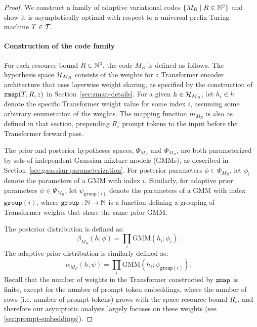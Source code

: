 \begin{proof}
We construct a family of adaptive variational codes $\{ M_R \mid R \in {\mathbb{N}^2} \}$ and show it is asymptotically optimal with respect to a universal prefix Turing machine $T \in {\mathcal{T}}$.

\paragraph{Construction of the code family}
For each resource bound $R \in {\mathbb{N}^2}$, the code $M_R$ is defined as follows.
The hypothesis space ${\mathcal{H}}_{M_R}$ consists of the weights for a Transformer encoder architecture that uses layerwise weight sharing, as specified by the construction of $\texttt{zmap}(T,R,z)$ in Section~\ref{sec:zmap-details}. For a given $h \in {\mathcal{H}}_{M_R}$, let $h_i \in h$ denote the specific Transformer weight value for some index $i$, assuming some arbitrary enumeration of the weights.
The mapping function $m_{M_R}$ is also as defined in that section, prepending $R_s$ prompt tokens to the input before the Transformer forward pass. 

The prior and posterior hypotheses spaces, $\Psi_{M_R}$ and $\Phi_{M_R}$, are both parameterized by sets of independent Gaussian mixture models (GMMs), as described in Section~\ref{sec:gaussian-parameterization}. For posterior parameters $\phi \in \Phi_{M_R}$, let $\phi_i$ denote the parameters of a GMM with index $i$. Similarly, for adaptive prior parameters $\psi \in \Psi_{M_R}$, let $\psi_{\texttt{group}(i)}$ denote the parameters of a GMM with index $\texttt{group}(i)$, where $\texttt{group}: \mathbb{N} \rightarrow \mathbb{N}$ is a function defining a grouping of Transformer weights that share the same prior GMM. 

The posterior distribution is defined as:
\begin{equation}
    \beta_{M_R}(h; \phi) = \prod_i \text{GMM}(h_i; \phi_i).
\end{equation}
The adaptive prior distribution is similarly defined as:
\begin{equation}
    \alpha_{M_R}(h; \psi) = \prod_i \text{GMM}(h_i; \psi_{\texttt{group}(i)}).
\end{equation}
Recall that the number of weights in the Transformer constructed by $\texttt{zmap}$ is finite, except for the number of prompt token embeddings, where the number of rows (i.e. number of prompt tokens) grows with the space resource bound $R_s$, and therefore our asymptotic analysis largely focuses on these weights (see \ref{sec:prompt-embeddings}).


\end{proof}
